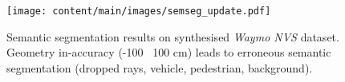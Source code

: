 \begin{figure}[t]
    \centering
        \texttt{[image: content/main/images/semseg\_update.pdf]}
        \caption{Semantic segmentation results on synthesised \textit{Waymo NVS} dataset. Geometry in-accuracy (-100 \bwr~100 cm) leads to erroneous semantic segmentation ({\setlength{\fboxsep}{0pt}\colorbox{ourgray}{dropped rays}}, {\setlength{\fboxsep}{0pt}\colorbox{sem0}{vehicle}}, {\setlength{\fboxsep}{0pt}\colorbox{sem1}{pedestrian}}, {\setlength{\fboxsep}{0pt}\colorbox{sem2}{background}}).}
    \label{fig:semseg}
\end{figure}